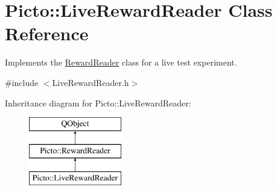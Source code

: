 \hypertarget{class_picto_1_1_live_reward_reader}{\section{Picto\-:\-:Live\-Reward\-Reader Class Reference}
\label{class_picto_1_1_live_reward_reader}
}


Implements the \hyperlink{class_picto_1_1_reward_reader}{Reward\-Reader} class for a live test experiment.  




{\ttfamily \#include $<$Live\-Reward\-Reader.\-h$>$}

Inheritance diagram for Picto\-:\-:Live\-Reward\-Reader\-:\begin{figure}[H]
\begin{center}
\leavevmode
\includegraphics[height=3.000000cm]{class_picto_1_1_live_reward_reader}
\end{center}
\end{figure}
